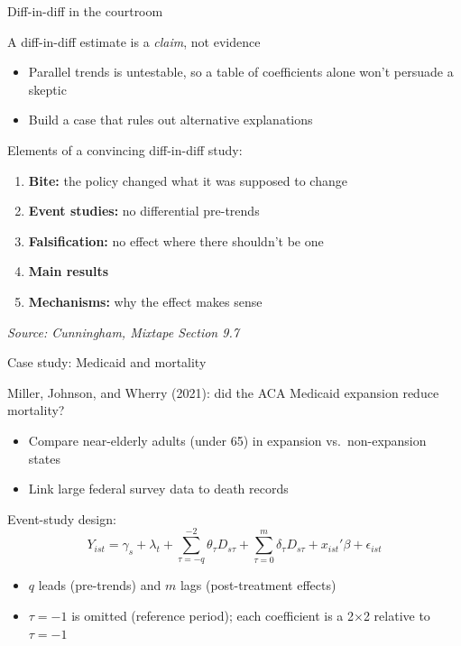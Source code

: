 \documentclass[compress, 8pt]{beamer}
\begin{document}
\begin{frame}{Diff-in-diff in the courtroom}

A diff-in-diff estimate is a \emph{claim}, not evidence
\begin{itemize}
    \item Parallel trends is untestable, so a table of coefficients alone won't persuade a skeptic
    \item Build a case that rules out alternative explanations
\end{itemize}

\vspace{2ex}
Elements of a convincing diff-in-diff study:
\begin{enumerate}
    \item \textbf{Bite:} the policy changed what it was supposed to change
    \item \textbf{Event studies:} no differential pre-trends
    \item \textbf{Falsification:} no effect where there shouldn't be one
    \item \textbf{Main results}
    \item \textbf{Mechanisms:} why the effect makes sense
\end{enumerate}

\vspace{2ex}
\emph{Source: Cunningham, Mixtape Section 9.7}
\end{frame}

\begin{frame}{Case study: Medicaid and mortality}

Miller, Johnson, and Wherry (2021): did the ACA Medicaid expansion reduce mortality?
\begin{itemize}
    \item Compare near-elderly adults (under 65) in expansion vs.\ non-expansion states
    \item Link large federal survey data to death records
\end{itemize}

\vspace{2ex}
Event-study design:
\begin{equation*}
    Y_{ist} = \gamma_s + \lambda_t  + \sum_{\tau = -q}^{-2} \theta_\tau D_{s\tau}
    + \sum_{\tau=0}^m \delta_\tau D_{s\tau} + x_{ist}'\beta + \epsilon_{ist}
\end{equation*}
\begin{itemize}
    \item $q$ leads (pre-trends) and $m$ lags (post-treatment effects)
    \item $\tau = -1$ is omitted (reference period); each coefficient is a 2$\times$2 relative to $\tau = -1$
\end{itemize}

\end{frame}
\end{document}
